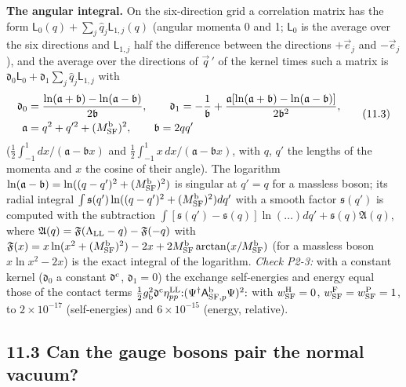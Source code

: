 \documentclass[
  10pt,
]{article}
\begin{document}
\textbf{The angular integral.} On the six-direction grid a correlation
matrix has the form \(\mathsf L_0(q)+\sum_j\hat q_j\mathsf L_{1,j}(q)\)
(angular momenta 0 and 1; \(\mathsf L_0\) is the average over the six
directions and \(\mathsf L_{1,j}\) half the difference between the
directions \(+\vec e_j\) and \(-\vec e_j\)), and the average over the
directions of \(\vec q\,'\) of the kernel times such a matrix is
\(\mathfrak d_0\mathsf L_0+\mathfrak d_1\sum_j\hat q_j\mathsf L_{1,j}\)
with
\[\begin{aligned}\mathfrak d_0&=\frac{\ln(\mathfrak a+\mathfrak b)-\ln(\mathfrak a-\mathfrak b)}{2\mathfrak b},\qquad\mathfrak d_1=-\frac1{\mathfrak b}+\frac{\mathfrak a[\ln(\mathfrak a+\mathfrak b)-\ln(\mathfrak a-\mathfrak b)]}{2\mathfrak b^2},\\\mathfrak a&=q^2+q'^2+(M^{\rm b}_{\rm SF})^2,\qquad\mathfrak b=2qq'\end{aligned}\tag{11.3}\]
(\(\tfrac12\int_{-1}^1dx/(\mathfrak a-\mathfrak bx)\) and
\(\tfrac12\int_{-1}^1x\,dx/(\mathfrak a-\mathfrak bx)\), with \(q\),
\(q'\) the lengths of the momenta and \(x\) the cosine of their angle).
The logarithm
\(\ln(\mathfrak a-\mathfrak b)=\ln((q-q')^2+(M^{\rm b}_{\rm SF})^2)\) is
singular at \(q'=q\) for a massless boson; its radial integral
\(\int\mathfrak s(q')\ln((q-q')^2+(M^{\rm b}_{\rm SF})^2)dq'\) with a
smooth factor \(\mathfrak s(q')\) is computed with the subtraction
\(\int[\mathfrak s(q')-\mathfrak s(q)]\ln(\dots)dq'+\mathfrak s(q)\mathfrak A(q)\),
where \(\mathfrak A(q)=\mathfrak F(\Lambda_{\rm LL}-q)-\mathfrak F(-q)\)
with
\(\mathfrak F(x)=x\ln(x^2+(M^{\rm b}_{\rm SF})^2)-2x+2M^{\rm b}_{\rm SF}\arctan(x/M^{\rm b}_{\rm SF})\)
(for a massless boson \(x\ln x^2-2x\)) is the exact integral of the
logarithm. \emph{Check P2-3:} with a constant kernel (\(\mathfrak d_0\)
a constant \(\mathfrak d^{\rm c}\), \(\mathfrak d_1=0\)) the exchange
self-energies and energy equal those of the contact terms
\(\tfrac12g_{\rm b}^2\mathfrak d^{\rm c}\eta^{\rm LL}_{pp}{:}(\Psi^\dagger\mathsf A^{\rm b}_{{\rm SF},p}\Psi)^2{:}\)
with \(w^{\rm H}_{\rm SF}=0\),
\(w^{\rm F}_{\rm SF}=w^{\rm P}_{\rm SF}=1\), to \(2\times10^{-17}\)
(self-energies) and \(6\times10^{-15}\) (energy, relative).

\hypertarget{can-the-gauge-bosons-pair-the-normal-vacuum}{%
\subsection{11.3 Can the gauge bosons pair the normal
vacuum?}\label{can-the-gauge-bosons-pair-the-normal-vacuum}}
\end{document}
